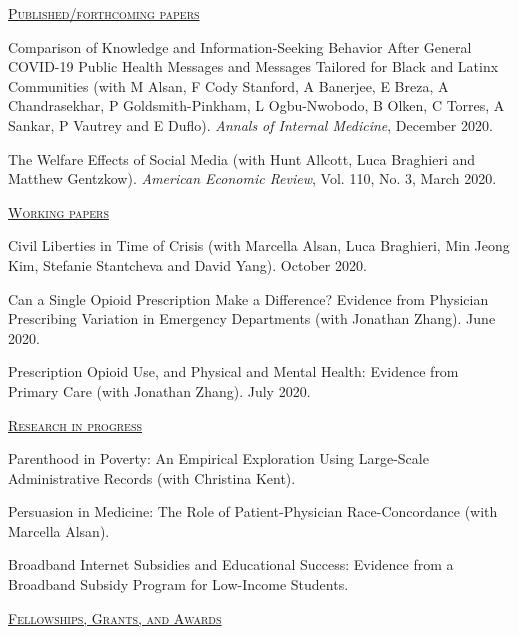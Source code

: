 \documentclass[letterpaper,11pt]{article}
\begin{document}
 \underline {\textsc{Published/forthcoming papers}}

Comparison of Knowledge and Information-Seeking Behavior After General COVID-19 Public Health Messages and Messages Tailored for Black and Latinx Communities (with M Alsan, F Cody Stanford, A Banerjee, E Breza, A Chandrasekhar, P Goldsmith-Pinkham, L Ogbu-Nwobodo, B Olken, C Torres, A Sankar, P Vautrey and E Duflo). \textit{Annals of Internal Medicine}, December 2020.
 
The Welfare Effects of Social Media (with Hunt Allcott, Luca Braghieri and Matthew Gentzkow). \textit{American Economic Review}, Vol. 110, No. 3, March 2020.

\medskip

\underline {\textsc{Working papers}}

Civil Liberties in Time of Crisis (with Marcella Alsan, Luca Braghieri, Min Jeong Kim, Stefanie Stantcheva and David Yang). October 2020.

Can a Single Opioid Prescription Make a Difference? Evidence from Physician Prescribing Variation in Emergency Departments (with Jonathan Zhang). June 2020.

Prescription Opioid Use, and Physical and Mental Health: Evidence from Primary Care (with Jonathan Zhang). July 2020.


\medskip


\underline {\textsc{Research in progress}}

Parenthood in Poverty: An Empirical Exploration Using Large-Scale Administrative Records (with Christina Kent).

Persuasion in Medicine: The Role of Patient-Physician Race-Concordance (with Marcella Alsan).

Broadband Internet Subsidies and Educational Success: Evidence from a Broadband Subsidy Program for Low-Income Students.

 
 \medskip


\underline {\textsc{Fellowships, Grants, and Awards}}
\end{document}

